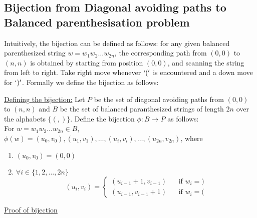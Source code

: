 \subsection{Bijection from Diagonal avoiding paths to Balanced parenthesisation problem}
Intuitively, the bijection can be defined as follows: for any given balanced parenthesized string $w = w_1w_2\ldots w_{2n}$, the corresponding path from $(0,0)$ to $(n,n)$ is obtained by starting from position $(0,0)$, and scanning the string from left to right. Take  right move whenever $`('$ is encountered and a down move for $`)'$. Formally we define the bijection as follows:
\medskip{}

\noindent\underline{Defining the bijection:} Let $P$ be the set of diagonal avoiding paths from $(0,0)$ to $(n,n)$  and $B$ be the set of balanced paranthesized  strings of length $2n$ over the alphabets $\{(,)\}$. Define the bijection $\phi:B\rightarrow P$ as follows:\\
For $w=w_1 w_2 \ldots w_{2n}\in B$, $\phi(w) = (u_0,v_0), (u_1,v_1), \ldots, (u_i, v_i), \ldots, (u_{2n}, v_{2n})$, where 
\begin{enumerate}
    \item $(u_0,v_0)=(0,0)$ 
    \item $\forall i\in\{1,2,\ldots, 2n\}$\\
    \[
    (u_i, v_i) = 
    \begin{cases}  
    (u_{i-1}+1, v_{i-1})& ~~~~\text{if }w_i=)\\
    (u_{i-1}, v_{i-1}+1)&~~~~\text{if }w_i=(
    \end{cases}
    \]
\end{enumerate}
\underline{Proof of bijection}

